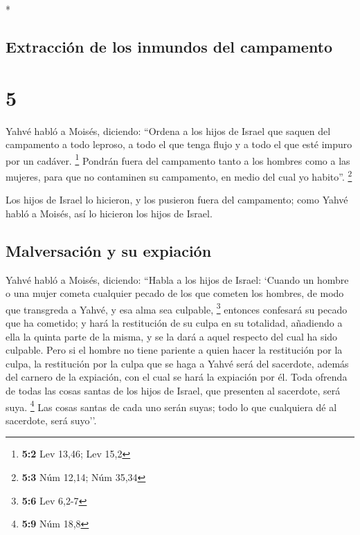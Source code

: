 \begin{paracol}{2}
\begin{otherlanguage}{english}
\end{otherlanguage}

\switchcolumn[0]*

\hypertarget{extracciuxf3n-de-los-inmundos-del-campamento}{%
\subsection{Extracción de los inmundos del
campamento}\label{extracciuxf3n-de-los-inmundos-del-campamento}}

\hypertarget{section-8}{%
\section{5}\label{section-8}}

 Yahvé habló a Moisés, diciendo:  ``Ordena a
los hijos de Israel que saquen del campamento a todo leproso, a todo el
que tenga flujo y a todo el que esté impuro por un cadáver. \footnote{\textbf{5:2}
  Lev 13,46; Lev 15,2}  Pondrán fuera del campamento tanto
a los hombres como a las mujeres, para que no contaminen su campamento,
en medio del cual yo habito''. \footnote{\textbf{5:3} Núm 12,14; Núm
  35,34}

 Los hijos de Israel lo hicieron, y los pusieron fuera del
campamento; como Yahvé habló a Moisés, así lo hicieron los hijos de
Israel.

\hypertarget{malversaciuxf3n-y-su-expiaciuxf3n}{%
\subsection{Malversación y su
expiación}\label{malversaciuxf3n-y-su-expiaciuxf3n}}

 Yahvé habló a Moisés, diciendo:  ``Habla a
los hijos de Israel: `Cuando un hombre o una mujer cometa cualquier
pecado de los que cometen los hombres, de modo que transgreda a Yahvé, y
esa alma sea culpable, \footnote{\textbf{5:6} Lev 6,2-7} 
entonces confesará su pecado que ha cometido; y hará la restitución de
su culpa en su totalidad, añadiendo a ella la quinta parte de la misma,
y se la dará a aquel respecto del cual ha sido culpable. 
Pero si el hombre no tiene pariente a quien hacer la restitución por la
culpa, la restitución por la culpa que se haga a Yahvé será del
sacerdote, además del carnero de la expiación, con el cual se hará la
expiación por él.  Toda ofrenda de todas las cosas santas
de los hijos de Israel, que presenten al sacerdote, será suya.
\footnote{\textbf{5:9} Núm 18,8}  Las cosas santas de
cada uno serán suyas; todo lo que cualquiera dé al sacerdote, será
suyo''.


\end{paracol}
